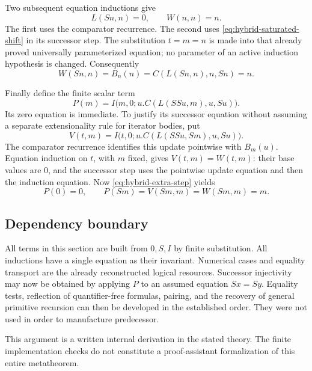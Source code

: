 \documentclass[11pt,a4paper]{article}
\theoremstyle{definition}\newtheorem{definition}[theorem]{Definition}
\begin{document}
Two subsequent equation inductions give
\begin{equation}
 L(Sn,n)=0,\qquad W(n,n)=n.
 \label{eq:hybrid-diagonals}
\end{equation}
The first uses the comparator recurrence.  The second uses
\eqref{eq:hybrid-saturated-shift} in its successor step.  The
substitution $t=m=n$ is made into that already proved universally
parameterized equation; no parameter of an active induction hypothesis
is changed.  Consequently
\begin{equation}
 W(Sn,n)=B_n(n)=C(L(Sn,n),n,Sn)=n.
 \label{eq:hybrid-extra-step}
\end{equation}

Finally define the finite scalar term
\begin{equation}
 P(m)=I\bigl(m,0;u.C(L(SSu,m),u,Su)\bigr).
 \label{eq:hybrid-predecessor-term}
\end{equation}
Its zero equation is immediate.  To justify its successor equation
without assuming a separate extensionality rule for iterator bodies,
put
\[
 V(t,m)=I\bigl(t,0;u.C(L(SSu,Sm),u,Su)\bigr).
\]
The comparator recurrence identifies this update pointwise with
$B_m(u)$.  Equation induction on $t$, with $m$ fixed, gives
$V(t,m)=W(t,m)$: their base values are $0$, and the successor step
uses the pointwise update equation and then the induction equation.
Now \eqref{eq:hybrid-extra-step} yields
\[
 \boxed{\qquad P(0)=0,\qquad P(Sm)=V(Sm,m)=W(Sm,m)=m.\qquad}
\]

\subsection{Dependency boundary}

All terms in this section are built from $0,S,I$ by finite substitution.
All inductions have a single equation as their invariant.  Numerical
cases and equality transport are the already reconstructed logical
resources.  Successor injectivity may now be obtained by applying $P$
to an assumed equation $Sx=Sy$.  Equality tests, reflection of
quantifier-free formulas, pairing, and the recovery of general
primitive recursion can then be developed in the established order.
They were not used in order to manufacture predecessor.

This argument is a written internal derivation in the stated theory.
The finite implementation checks do not constitute a proof-assistant
formalization of this entire metatheorem.

\end{document}
